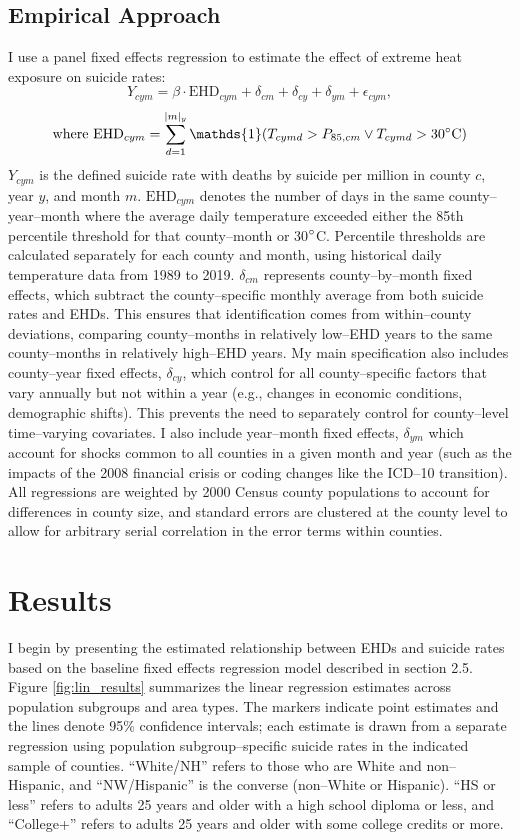 \documentclass[12pt, a4paper]{article}
\begin{document}
\subsection{Empirical Approach}
I use a panel fixed effects regression to estimate the effect of extreme heat exposure on suicide rates:
\[
Y_{cym} =  \beta\cdot\text{EHD}_{cym} + \delta_{cm} +\delta_{cy} +\delta_{ym} +\epsilon_{cym},
\]
\[
\text{where EHD}_{cym}=\sum_{d=1}^{|m|_y}\mathds{1}(T_{cymd}>P_{85,cm} \lor T_{cymd}>30\degree\text{C})
\]
$Y_{cym}$ is the defined suicide rate with deaths by suicide per million in county $c$, year $y$, and month $m$. $\text{EHD}_{cym}$ denotes the number of days in the same county--year--month where the average daily temperature exceeded either the 85th percentile threshold for that county--month or 30$\degree$C. Percentile thresholds are calculated separately for each county and month, using historical daily temperature data from 1989 to 2019. $\delta_{cm}$ represents county--by--month fixed effects, which subtract the county--specific monthly average from both suicide rates and EHDs. This ensures that identification comes from within--county deviations, comparing county--months in relatively low--EHD years to the same county--months in relatively high--EHD years. My main specification also includes county--year fixed effects, $\delta_{cy}$, which control for all county--specific factors that vary annually but not within a year (e.g., changes in economic conditions, demographic shifts). This prevents the need to separately control for county--level time--varying covariates. I also include year--month fixed effects, $\delta_{ym}$ which account for shocks common to all counties in a given month and year (such as the impacts of the 2008 financial crisis or coding changes like the ICD--10 transition). All regressions are weighted by 2000 Census county populations to account for differences in county size, and standard errors are clustered at the county level to allow for arbitrary serial correlation in the error terms within counties.


\section{Results}
I begin by presenting the estimated relationship between EHDs and suicide rates based on the baseline fixed effects regression model described in section 2.5. Figure \ref{fig:lin_results} summarizes the linear regression estimates across population subgroups and area types. The markers indicate point estimates and the lines denote 95\% confidence intervals; each estimate is drawn from a separate regression using population subgroup--specific suicide rates in the indicated sample of counties. ``White/NH'' refers to those who are White and non--Hispanic, and ``NW/Hispanic'' is the converse (non--White or Hispanic). ``HS or less'' refers to adults 25 years and older with a high school diploma or less, and ``College+'' refers to adults 25 years and older with some college credits or more.
\end{document}
